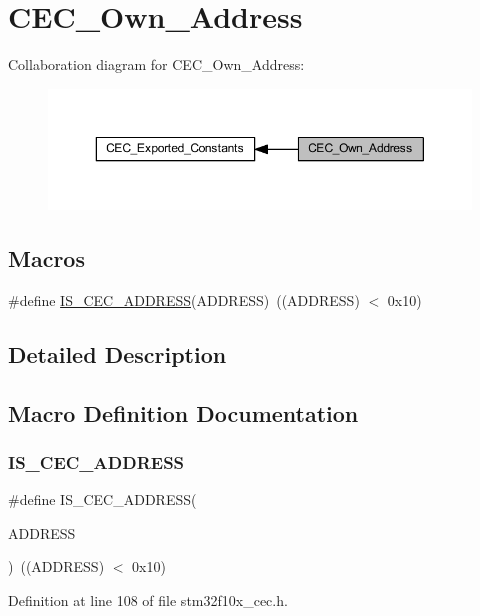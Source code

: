 \hypertarget{group___c_e_c___own___address}{}\section{C\+E\+C\+\_\+\+Own\+\_\+\+Address}
\label{group___c_e_c___own___address}
Collaboration diagram for C\+E\+C\+\_\+\+Own\+\_\+\+Address\+:
\nopagebreak
\begin{figure}[H]
\begin{center}
\leavevmode
\includegraphics[width=350pt]{group___c_e_c___own___address}
\end{center}
\end{figure}
\subsection*{Macros}
\begin{DoxyCompactItemize}
\item 
\#define \hyperlink{group___c_e_c___own___address_ga0659314b0be6092e73aa373394816557}{I\+S\+\_\+\+C\+E\+C\+\_\+\+A\+D\+D\+R\+E\+SS}(A\+D\+D\+R\+E\+SS)~((A\+D\+D\+R\+E\+SS) $<$ 0x10)
\end{DoxyCompactItemize}


\subsection{Detailed Description}


\subsection{Macro Definition Documentation}
\mbox{\label{group___c_e_c___own___address_ga0659314b0be6092e73aa373394816557}} 
\subsubsection{\texorpdfstring{I\+S\+\_\+\+C\+E\+C\+\_\+\+A\+D\+D\+R\+E\+SS}{IS\_CEC\_ADDRESS}}
{\footnotesize\ttfamily \#define I\+S\+\_\+\+C\+E\+C\+\_\+\+A\+D\+D\+R\+E\+SS(\begin{DoxyParamCaption}\item[{}]{A\+D\+D\+R\+E\+SS }\end{DoxyParamCaption})~((A\+D\+D\+R\+E\+SS) $<$ 0x10)}



Definition at line 108 of file stm32f10x\+\_\+cec.\+h.

